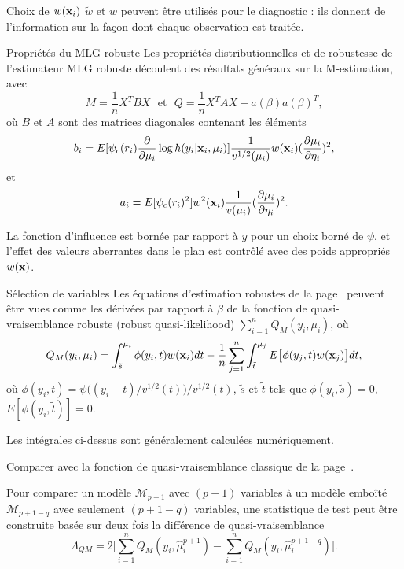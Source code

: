 \documentclass{BeamerTemplate}
\begin{document}
\begin{refsection}
\begin{frame}{Choix de $w({\bf x}_i)$}
\bigskip
$\tilde{w}$ et $w$ peuvent être utilisés pour le diagnostic : ils donnent de l'information sur la façon dont chaque observation est traitée.
\end{frame}

\begin{frame}{Propriétés du MLG robuste}
Les propriétés distributionnelles et de robustesse de l'estimateur MLG robuste découlent des résultats généraux sur la M-estimation, avec
$$M=\frac{1}{n} X^T B X \ \ \ \mbox{et} \ \ \ Q=\frac{1}{n} X^T A X  - a(\beta) a(\beta)^T,$$
où $B$ et $A$ sont des matrices diagonales contenant les éléments
$$b_i = E[\psi_c(r_i) \frac{\partial}{\partial \mu_i} \log h(y_i |{\bf x}_i,
\mu_i)] \frac{1}{v^{1/2}(\mu_i)}  w({\bf x}_i) (\frac{\partial \mu_i}{\partial
\eta_i})^2,$$
et
$$a_i= E[\psi_c(r_i)^2] w^2({\bf x}_i)
\frac{1}{v(\mu_i)} ( \frac{\partial \mu_i}{\partial \eta_i})^2.$$

La fonction d'influence est bornée par rapport à $y$ pour un choix borné de $\psi$, et l'effet des valeurs aberrantes dans le plan est contrôlé avec des poids appropriés $w({\bf x})$.
\end{frame}

\begin{frame}{Sélection de variables}
Les équations d'estimation robustes de la page~\pageref{EEw.page} peuvent être vues comme les dérivées par rapport à $\beta$ de la fonction de {\color{blue}quasi-vraisemblance robuste (robust quasi-likelihood)} $\sum_{i=1}^n Q_M(y_i, \mu_i)$, où
\begin{equation*}
\label{QM.explicit}
Q_M(y_i, \mu_i) = \int_{\tilde{s}}^{\mu_i} \phi(y_i, t) w({\bf x}_i)
dt - \frac{1}{n} \sum_{j=1}^n \int_{\tilde{t}}^{\mu_j} E \big[ \phi(y_j,t) w({\bf
x}_j) \big] dt,
\end{equation*}
où $\phi(y_i,t) = \psi\big((y_i-t)/v^{1/2}(t)\big)/v^{1/2}(t)$, $\tilde{s}$ et $\tilde{t}$ tels que $\phi(y_i, \tilde{s}) = 0$, $E[\phi(y_i,\tilde{t})] = 0$.

\bigskip
Les intégrales ci-dessus sont généralement calculées numériquement.

\bigskip
Comparer avec la fonction de quasi-vraisemblance classique de la page~\pageref{QL.page}.
\end{frame}

\begin{frame}{}
Pour comparer un modèle ${\mathcal M}_{p+1}$ avec $(p+1)$ variables à un modèle emboîté ${\mathcal M}_{p+1-q}$ avec seulement $(p+1-q)$ variables, une statistique de test peut être construite basée sur deux fois la {\color{blue}différence de quasi-vraisemblance}
\begin{equation*}
\label{quasi.dev}
\Lambda_{QM} = 2 \Big[ \sum_{i=1}^n Q_M(y_i, \hat{\mu}^{p+1}_i) - \sum_{i=1}^n
Q_M(y_i, \hat{\mu}^{p+1-q}_i) \Big].
\end{equation*}


\end{frame}
\end{refsection}
\end{document}

